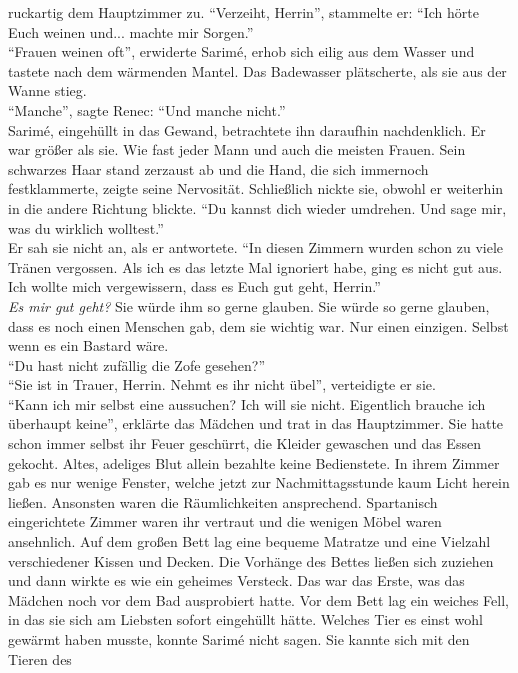 ruckartig dem Hauptzimmer zu. ``Verzeiht, Herrin'', stammelte er: ``Ich hörte Euch weinen und... 
machte mir Sorgen.''\\
``Frauen weinen oft'', erwiderte Sarimé, erhob sich eilig aus dem Wasser und tastete nach dem 
wärmenden Mantel. Das Badewasser plätscherte, als sie aus der Wanne stieg.\\
``Manche'', sagte Renec: ``Und manche nicht.''\\
Sarimé, eingehüllt in das Gewand, betrachtete ihn daraufhin nachdenklich. Er war größer 
als sie. Wie fast jeder Mann und auch die meisten Frauen. Sein schwarzes Haar stand 
zerzaust ab und die Hand, die sich immernoch festklammerte, zeigte seine Nervosität. Schließlich 
nickte sie, obwohl er weiterhin in die andere Richtung blickte. ``Du kannst dich wieder umdrehen. 
Und sage mir, was du wirklich wolltest.''\\
Er sah sie nicht an, als er antwortete. ``In diesen Zimmern wurden schon zu viele Tränen vergossen. 
Als ich es das letzte Mal ignoriert habe, ging es nicht gut aus. Ich wollte mich vergewissern, dass 
es Euch gut geht, Herrin.''\\
\textit{Es mir gut geht?} Sie würde ihm so gerne glauben. Sie würde so gerne glauben, dass es noch 
einen Menschen gab, dem sie wichtig war. Nur einen einzigen. Selbst wenn es ein Bastard wäre.\\
``Du hast nicht zufällig die Zofe gesehen?''\\
``Sie ist in Trauer, Herrin. Nehmt es ihr nicht übel'', verteidigte er sie.\\
``Kann ich mir selbst eine aussuchen? Ich will sie nicht. Eigentlich brauche ich überhaupt keine'', 
erklärte das Mädchen und trat in das Hauptzimmer. Sie hatte schon immer selbst ihr Feuer geschürrt, 
die Kleider gewaschen und das Essen gekocht. Altes, adeliges Blut allein bezahlte keine 
Bedienstete. In ihrem Zimmer gab es nur wenige Fenster, welche jetzt zur Nachmittagsstunde kaum 
Licht herein ließen. Ansonsten 
waren die Räumlichkeiten ansprechend. Spartanisch eingerichtete Zimmer waren ihr vertraut und die 
wenigen Möbel waren ansehnlich. Auf dem großen Bett lag eine bequeme Matratze und eine Vielzahl 
verschiedener Kissen und Decken. Die Vorhänge des Bettes ließen sich zuziehen und dann wirkte es wie 
ein geheimes Versteck. Das war das Erste, was das Mädchen noch vor dem Bad ausprobiert hatte. Vor 
dem Bett lag ein weiches Fell, in das sie sich am Liebsten sofort eingehüllt hätte. Welches Tier es 
einst wohl gewärmt haben musste, konnte Sarimé nicht sagen. Sie kannte sich mit den Tieren des 
